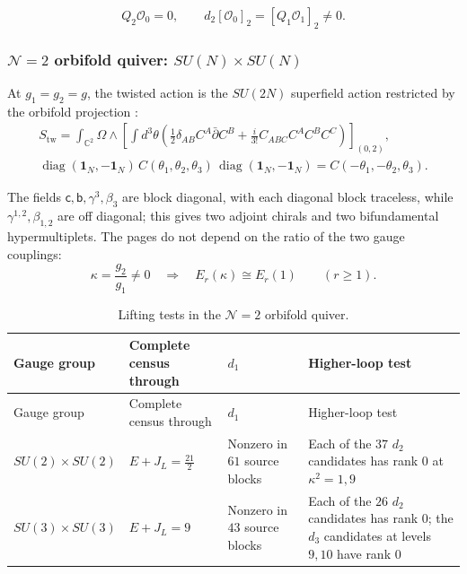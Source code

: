 \documentclass[11pt]{article}
\numberwithin{equation}{section}
\numberwithin{figure}{section}
\numberwithin{table}{section}
\begin{document}
\begin{equation}\label{local-ch9-beta-first-lift}
Q_2\mathcal O_0=0,\qquad
d_2[\mathcal O_0]_2=[Q_1\mathcal O_1]_2\ne0.
\end{equation}

\subsubsection{$\mathcal N=2$ orbifold quiver: $SU(N)\times SU(N)$}\label{sec-results-quiver}

At $g_1=g_2=g$, the twisted action is the $SU(2N)$ superfield action restricted by the orbifold projection \cite[results report, \S3.1]{Repo}:
\begin{equation}\label{local-ch9-quiver-action}
\begin{gathered}
S_{\mathrm{tw}}=\int_{\mathbb C^2}\Omega\wedge
\left[\int d^3\theta\left(\frac12\delta_{AB}C^A\bar\partial C^B
+\frac{i}{3!}C_{ABC}C^AC^BC^C\right)\right]_{(0,2)},\\
\operatorname{diag}(\mathbf1_N,-\mathbf1_N)\,
C(\theta_1,\theta_2,\theta_3)\,
\operatorname{diag}(\mathbf1_N,-\mathbf1_N)
=C(-\theta_1,-\theta_2,\theta_3).
\end{gathered}
\end{equation}

The fields $\mathsf c,\mathsf b,\gamma^3,\beta_3$ are block diagonal, with each diagonal block traceless, while $\gamma^{1,2},\beta_{1,2}$ are off diagonal; this gives two adjoint chirals and two bifundamental hypermultiplets. The pages do not depend on the ratio of the two gauge couplings:
\begin{equation}\label{local-ch9-quiver-couplings}
\kappa=\frac{g_2}{g_1}\ne0
\quad\Longrightarrow\quad E_r(\kappa)\cong E_r(1)
\qquad(r\ge1).
\end{equation}

{\footnotesize\renewcommand{\arraystretch}{1.3}\setlength{\tabcolsep}{3.5pt}
\begin{xltabular}{\linewidth}{|l|>{\raggedright\arraybackslash}p{2.6cm}|>{\raggedright\arraybackslash}X|>{\raggedright\arraybackslash}X|}
\caption{Lifting tests in the $\mathcal N=2$ orbifold quiver.}\label{local-ch9-quiver-results}\\
\hline
Gauge group & Complete census through & $d_1$ & Higher-loop test\\
\hline\endfirsthead
\hline
Gauge group & Complete census through & $d_1$ & Higher-loop test\\
\hline\endhead
$SU(2)\times SU(2)$ & $E+J_L=\tfrac{21}2$ & Nonzero in $61$ source blocks & Each of the $37$ $d_2$ candidates has rank $0$ at $\kappa^2=1,9$\\
\hline
$SU(3)\times SU(3)$ & $E+J_L=9$ & Nonzero in $43$ source blocks & Each of the $26$ $d_2$ candidates has rank $0$; the $d_3$ candidates at levels $9,10$ have rank $0$\\
\hline
\end{xltabular}}
\end{document}

